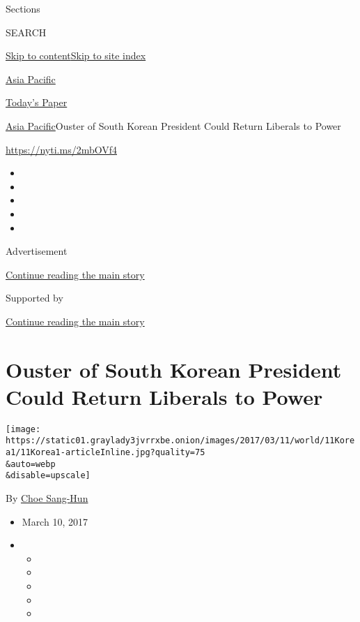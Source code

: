 Sections

SEARCH

\protect\hyperlink{site-content}{Skip to
content}\protect\hyperlink{site-index}{Skip to site index}

\href{https://www.nytimes3xbfgragh.onion/section/world/asia}{Asia
Pacific}

\href{https://myaccount.nytimes3xbfgragh.onion/auth/login?response_type=cookie\&client_id=vi}{}

\href{https://www.nytimes3xbfgragh.onion/section/todayspaper}{Today's
Paper}

\href{/section/world/asia}{Asia Pacific}\textbar{}Ouster of South Korean
President Could Return Liberals to Power

\url{https://nyti.ms/2mbOVf4}

\begin{itemize}
\item
\item
\item
\item
\item
\end{itemize}

Advertisement

\protect\hyperlink{after-top}{Continue reading the main story}

Supported by

\protect\hyperlink{after-sponsor}{Continue reading the main story}

\hypertarget{ouster-of-south-korean-president-could-return-liberals-to-power}{%
\section{Ouster of South Korean President Could Return Liberals to
Power}\label{ouster-of-south-korean-president-could-return-liberals-to-power}}

\texttt{[image: https://static01.graylady3jvrrxbe.onion/images/2017/03/11/world/11Korea1/11Korea1-articleInline.jpg?quality=75\\\&auto=webp\\\&disable=upscale]}

By \href{http://www.nytimes3xbfgragh.onion/by/choe-sang-hun}{Choe
Sang-Hun}

\begin{itemize}
\item
  March 10, 2017
\item
  \begin{itemize}
  \item
  \item
  \item
  \item
  \item
  \end{itemize}
\end{itemize}

